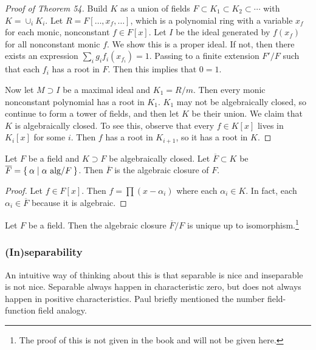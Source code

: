 \documentclass[10pt, twoside]{article}
\begin{document}
    \begin{proof}[Proof of Theorem 54]
        Build $K$ as a union of fields $F \subset K_1 \subset K_2 \subset \cdots$ with $K = \cup_i K_i$. Let $R = F[\ldots, x_f, \ldots]$, which is a polynomial ring with a variable $x_f$ for each monic, nonconstant $f \in F[x]$. Let $I$ be the ideal generated by $f(x_f)$ for all nonconstant monic $f$. We show this is a proper ideal. If not, then there exists an expression $\sum_i g_i f_i(x_{f_i}) = 1$. Passing to a finite extension $F'/F$ such that each $f_i$ has a root in $F$. Then this implies that $0=1$. 
        
        Now let $M \supset I$ be a maximal ideal and $K_1 = R/m$. Then every monic nonconstant polynomial has a root in $K_1$. $K_1$ may not be algebraically closed, so continue to form a tower of fields, and then let $K$ be their union. We claim that $K$ is algebraically closed. To see this, observe that every $f \in K[x]$ lives in $K_i[x]$ for some $i$. Then $f$ has a root in $K_{i+1}$, so it has a root in $K$.
    \end{proof}

    \begin{cor}
        Let $F$ be a field and $K \supset F$ be algebraically closed. Let $\overline{F} \subset K$ be $\overline{F} = \Set{\alpha | \alpha \text{ alg/}F}$. Then $\overline{F}$ is the algebraic closure of $F$.

        \begin{proof}
            Let $f \in F[x]$. Then $f = \prod(x-\alpha_i)$ where each $\alpha_i \in K$. In fact, each $\alpha_i \in \overline{F}$ because it is algebraic.
        \end{proof}
    \end{cor}

    \begin{thm}
        Let $F$ be a field. Then the algebraic closure $\overline{F}/F$ is unique up to isomorphism.\footnote{The proof of this is not given in the book and will not be given here.}
    \end{thm}

    \subsubsection{(In)separability} 
    An intuitive way of thinking about this is that separable is nice and inseparable is not nice. Separable always happen in characteristic zero, but does not always happen in positive characteristics. Paul briefly mentioned the number field-function field analogy.
\end{document}
